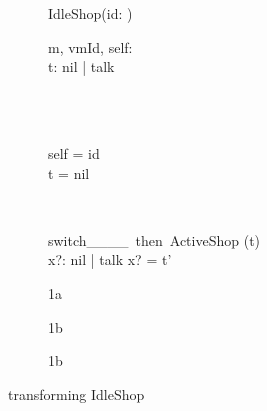 \begin{figure}
\begin{subfigure}{.5\textwidth}
  \centering
\begin{class}{IdleShop(id: \integer)}
\begin{state}
m, vmId, self: \integer
\\t: nil | talk
\end{state} 
\\
\begin{init}
\\self = id
\\t = nil
\end{init} 
\\
\begin{op}{switch\_\_\_\_\ then\ ActiveShop}
\Delta (t)
\\x?: nil | talk
\ST
x? = t'
\end{op}
\end{class}
  \caption{1a}
  \label{fig:sfig1}
\end{subfigure}%
\begin{subfigure}{.5\textwidth}
  \centering
{}
  \caption{1b}
  \label{fig:sfig2}
\end{subfigure}
\vspace{2em}

\begin{subfigure}{1\textwidth}
  \centering

  \caption{1b}
  \label{fig:sfig3}
\end{subfigure}
\caption{transforming IdleShop}
\label{fig:fig}
\end{figure}